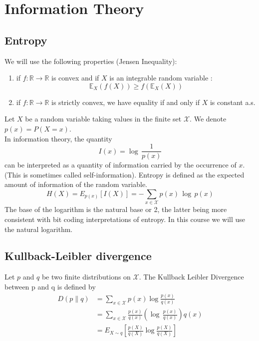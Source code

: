 \documentclass[12pt]{report}
\begin{document}
 
 

\maketitle


\section{Information Theory}
\subsection{Entropy}
We will use the following properties (Jensen Inequality):
\begin{enumerate}
\item if $f:\mathbb{R} \rightarrow \mathbb{R}$ is convex and if $X$ is an integrable random variable :
  $$\mathbb{E}_X(f(X))\geq f(\mathbb{E}_X(X))$$
\item if $f:\mathbb{R} \rightarrow \mathbb{R}$ is strictly convex, we have equality if and only if 
 $X$ is constant a.s.
\end{enumerate}


\begin{definition}[Entropy]
Let $X$ be a random variable taking values in the finite set $\mathcal{X}$. We denote $p(x)=P(X=x)$.\\
In information theory, the quantity
$$I(x)=\log \,\frac{1}{p(x)}$$
can be interpreted as a quantity of information carried by the occurrence of $x$. (This is sometimes called self-information). 
Entropy is defined as the expected amount of information of the random variable.
$$H(X)=E_{p(x)} \left[ I(X)\right]=-\sum_{x\in\mathcal{X}} p(x)\,\log \,p(x)$$
The base of the logarithm is the natural base or 2, the latter being more consistent with bit coding interpretations of entropy. In this course we will use the natural logarithm.
\end{definition}


\subsection{Kullback-Leibler divergence}

\begin{definition} 
Let $p$ and $q$ be two finite distributions on $\mathcal{X}$.
The Kullback Leibler Divergence between p and q is defined by
$$\begin{aligned}
D(p\parallel q) &= \sum_{x\in\mathcal{X}} p(x)\log  \frac{p(x)}{q(x)} \\
&= \sum_{x\in\mathcal{X}} \frac{p(x)}{q(x)} \left(\log\, \frac{p(x)}{q(x)}\right)q(x)\\
&=E_{X\sim q}\left[\frac{p(X)}{q(X)} \log \frac{p(X)}{q(X)}\right]
\end{aligned}$$
\end{definition}
\end{document}
